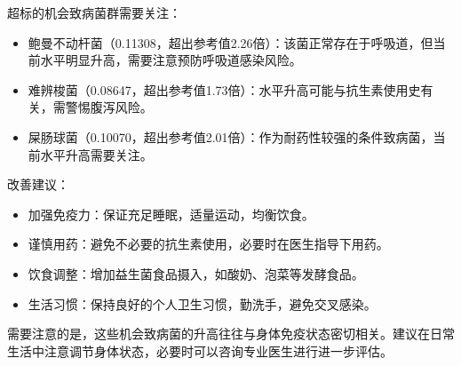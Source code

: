 \documentclass[UTF8]{ctexart}
\begin{document}
\begin{center}
\end{center}

\begin{tcolorbox}[
    enhanced,
    colback=gray!3,
    colframe=gray!3,
    arc=3mm,
    boxrule=0pt,
    width=\textwidth,
    top=8pt,
    bottom=8pt
    ]
{\small{\textcolor{yellow!85!orange}{\faLightbulb}}\quad 超标的机会致病菌群需要关注：
\begin{itemize}
\item 鲍曼不动杆菌（0.11308，超出参考值2.26倍）：该菌正常存在于呼吸道，但当前水平明显升高，需要注意预防呼吸道感染风险。
\item 难辨梭菌（0.08647，超出参考值1.73倍）：水平升高可能与抗生素使用史有关，需警惕腹泻风险。
\item 屎肠球菌（0.10070，超出参考值2.01倍）：作为耐药性较强的条件致病菌，当前水平升高需要关注。
\end{itemize}

{\textcolor{green!85!black}{\faLightbulb}}\quad 改善建议：
\begin{itemize}
\item 加强免疫力：保证充足睡眠，适量运动，均衡饮食。
\item 谨慎用药：避免不必要的抗生素使用，必要时在医生指导下用药。
\item 饮食调整：增加益生菌食品摄入，如酸奶、泡菜等发酵食品。
\item 生活习惯：保持良好的个人卫生习惯，勤洗手，避免交叉感染。
\end{itemize}

需要注意的是，这些机会致病菌的升高往往与身体免疫状态密切相关。建议在日常生活中注意调节身体状态，必要时可以咨询专业医生进行进一步评估。
}
\end{tcolorbox}
\end{document}
